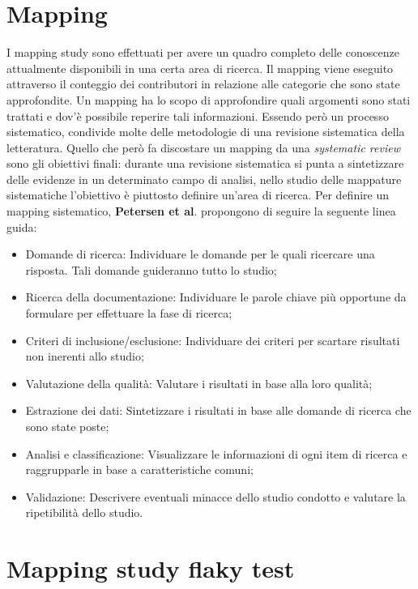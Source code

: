 \fancyhead[C]{}
\section{Mapping}
I mapping study sono effettuati per avere un quadro completo
delle conoscenze attualmente disponibili in una certa area di ricerca. Il mapping viene eseguito attraverso il conteggio dei contributori in relazione alle categorie che sono state approfondite. Un mapping ha lo scopo di approfondire quali argomenti
sono stati trattati e dov’è possibile reperire tali informazioni. Essendo però un processo sistematico, condivide molte delle metodologie di una revisione sistematica della letteratura. Quello che però fa discostare un mapping da una
\emph{systematic review} sono gli obiettivi finali: durante una revisione sistematica si punta a sintetizzare delle evidenze in un determinato campo di analisi, nello studio delle
mappature sistematiche l’obiettivo è piuttosto definire un'area di ricerca.
Per definire un mapping sistematico, \textbf{Petersen et al}.\cite{petersen2015guidelines} propongono di seguire la seguente linea guida:
\begin{itemize}
	\item Domande di ricerca: Individuare le domande per le quali ricercare una risposta. Tali domande guideranno tutto lo studio;
	\item Ricerca della documentazione: Individuare le parole chiave più opportune da formulare per effettuare la fase di ricerca;
	\item Criteri di inclusione/esclusione: Individuare dei criteri per scartare risultati non inerenti allo studio;
	\item Valutazione della qualità: Valutare i risultati in base alla loro qualità;
	\item Estrazione dei dati: Sintetizzare i risultati in base alle domande di ricerca che sono state poste;
	\item Analisi e classificazione: Visualizzare le informazioni di ogni item di ricerca e raggrupparle in base a caratteristiche comuni;
	\item Validazione: Descrivere eventuali minacce dello studio condotto e valutare la ripetibilità dello studio.
\end{itemize}
\section{Mapping study flaky test}
